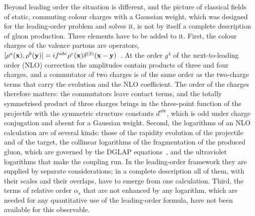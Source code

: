 Beyond leading order the situation is different, and the picture of classical fields of static, commuting colour charges with a Gaussian weight, which was designed for the leading-order problem and solves it, is not by itself a complete description of gluon production. Three elements have to be added to it. First, the colour charges of the valence partons are operators, $[\rho^a(\mathbf{x}),\rho^b(\mathbf{y})]=if^{abc}\rho^c(\mathbf{x})\delta^{(2)}(\mathbf{x}-\mathbf{y})$~\cite{Kovner:2005pe,Kovner:2005nq,Kovner:2005jc,Kovner:2005en}. At the order $g^4$ of the next-to-leading order (NLO) correction the amplitudes contain products of three and four charges, and a commutator of two charges is of the same order as the two-charge terms that carry the evolution and the NLO coefficient. The order of the charges therefore matters: the commutators leave contact terms, and the totally symmetrised product of three charges brings in the three-point function of the projectile with the symmetric structure constants $d^{abc}$, which is odd under charge conjugation and absent for a Gaussian weight. Second, the logarithms of an NLO calculation are of several kinds: those of the rapidity evolution of the projectile and of the target, the collinear logarithms of the fragmentation of the produced gluon, which are governed by the DGLAP equations~\cite{Gribov:1972ri,Altarelli:1977zs,Dokshitzer:1977sg}, and the ultraviolet logarithms that make the coupling run. In the leading-order framework they are supplied by separate considerations; in a complete description all of them, with their scales and their overlaps, have to emerge from one calculation. Third, the terms of relative order $\alpha_s$ that are not enhanced by any logarithm, which are needed for any quantitative use of the leading-order formula, have not been available for this observable.

